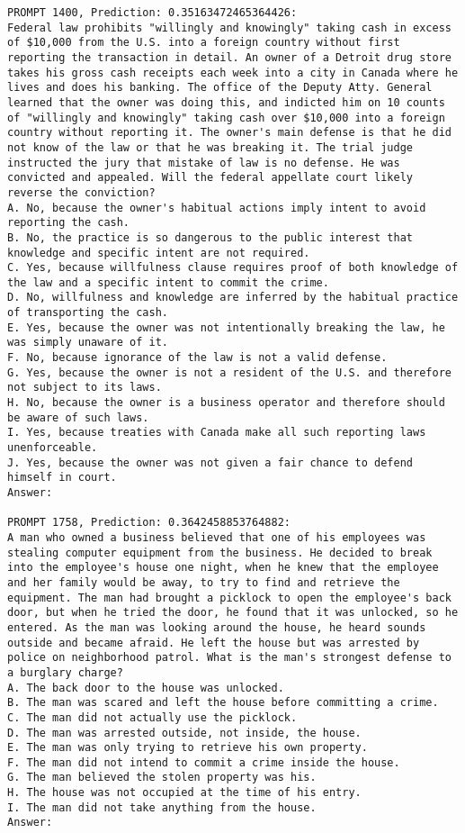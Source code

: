 \documentclass[11pt]{article}
\begin{document}
\begin{figure*}[tb]
    \centering
    \begin{tiny}
\begin{Verbatim}[breaklines=true]
PROMPT 1400, Prediction: 0.35163472465364426:
Federal law prohibits "willingly and knowingly" taking cash in excess of $10,000 from the U.S. into a foreign country without first reporting the transaction in detail. An owner of a Detroit drug store takes his gross cash receipts each week into a city in Canada where he lives and does his banking. The office of the Deputy Atty. General learned that the owner was doing this, and indicted him on 10 counts of "willingly and knowingly" taking cash over $10,000 into a foreign country without reporting it. The owner's main defense is that he did not know of the law or that he was breaking it. The trial judge instructed the jury that mistake of law is no defense. He was convicted and appealed. Will the federal appellate court likely reverse the conviction?
A. No, because the owner's habitual actions imply intent to avoid reporting the cash.
B. No, the practice is so dangerous to the public interest that knowledge and specific intent are not required.
C. Yes, because willfulness clause requires proof of both knowledge of the law and a specific intent to commit the crime.
D. No, willfulness and knowledge are inferred by the habitual practice of transporting the cash.
E. Yes, because the owner was not intentionally breaking the law, he was simply unaware of it.
F. No, because ignorance of the law is not a valid defense.
G. Yes, because the owner is not a resident of the U.S. and therefore not subject to its laws.
H. No, because the owner is a business operator and therefore should be aware of such laws.
I. Yes, because treaties with Canada make all such reporting laws unenforceable.
J. Yes, because the owner was not given a fair chance to defend himself in court.
Answer:

PROMPT 1758, Prediction: 0.3642458853764882:
A man who owned a business believed that one of his employees was stealing computer equipment from the business. He decided to break into the employee's house one night, when he knew that the employee and her family would be away, to try to find and retrieve the equipment. The man had brought a picklock to open the employee's back door, but when he tried the door, he found that it was unlocked, so he entered. As the man was looking around the house, he heard sounds outside and became afraid. He left the house but was arrested by police on neighborhood patrol. What is the man's strongest defense to a burglary charge?
A. The back door to the house was unlocked.
B. The man was scared and left the house before committing a crime.
C. The man did not actually use the picklock.
D. The man was arrested outside, not inside, the house.
E. The man was only trying to retrieve his own property.
F. The man did not intend to commit a crime inside the house.
G. The man believed the stolen property was his.
H. The house was not occupied at the time of his entry.
I. The man did not take anything from the house.
Answer:


\end{Verbatim}
\end{tiny}
\end{figure*}
\end{document}
